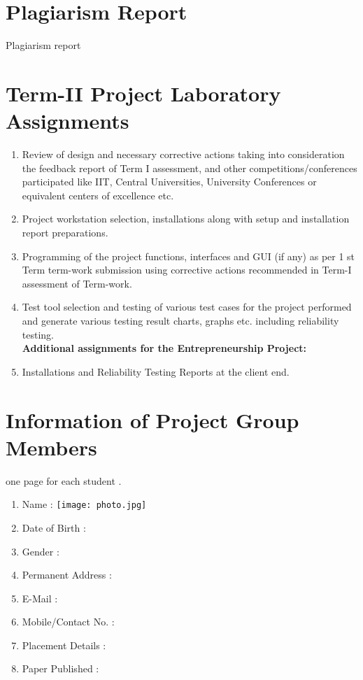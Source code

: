 \documentclass[oneside,a4paper,12pt]{report}
\begin{document}
\begin{appendices}
\begin{enumerate}
\end{enumerate}

\chapter{Plagiarism Report}
Plagiarism report
\chapter{ Term-II Project Laboratory Assignments}
\begin{enumerate}
\item Review of design and necessary corrective actions taking into consideration the feedback report of Term I assessment, and other competitions/conferences participated like IIT, Central Universities, University Conferences or equivalent centers of excellence etc.
\item Project workstation selection, installations along with setup and installation report preparations.
\item Programming of the project functions, interfaces and GUI (if any) as per 1 st Term term-work submission using corrective actions recommended in Term-I assessment of Term-work.
\item Test tool selection and testing of various test cases for the project performed and generate various testing result charts, graphs etc. including reliability testing.\\
\textbf{Additional assignments for the Entrepreneurship Project:}
\item Installations and Reliability Testing Reports at the client end.

\end{enumerate}
\chapter{Information of Project Group Members}
one page for each student .
\newpage
\begin{enumerate}
\item Name :  \hspace{90 mm}\texttt{[image: photo.jpg]}
\item Date of Birth :
\item Gender : 
\item Permanent Address :
\item E-Mail : 
\item Mobile/Contact No. :
\item Placement Details :
\item Paper Published : 

\end{enumerate}
\end{appendices}
\end{document}
